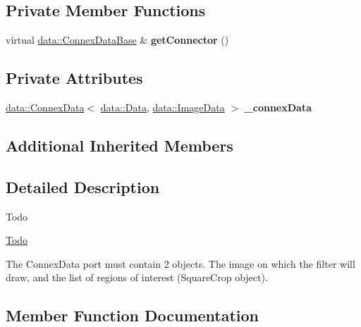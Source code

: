 \subsection*{Private Member Functions}
\begin{DoxyCompactItemize}
\item 
\mbox{\label{classfilter_1_1algos_1_1_overlay_filter_ac8ad6daecef26a002da6dae6ef3f52b2}} 
virtual \hyperlink{classfilter_1_1data_1_1_connex_data_base}{data\+::\+Connex\+Data\+Base} \& {\bfseries get\+Connector} ()
\end{DoxyCompactItemize}
\subsection*{Private Attributes}
\begin{DoxyCompactItemize}
\item 
\mbox{\label{classfilter_1_1algos_1_1_overlay_filter_ae0c4f19d551fb9af6fdb5de88d565017}} 
\hyperlink{classfilter_1_1data_1_1_connex_data}{data\+::\+Connex\+Data}$<$ \hyperlink{classfilter_1_1data_1_1_data}{data\+::\+Data}, \hyperlink{classfilter_1_1data_1_1_image_data}{data\+::\+Image\+Data} $>$ {\bfseries \+\_\+connex\+Data}
\end{DoxyCompactItemize}
\subsection*{Additional Inherited Members}


\subsection{Detailed Description}
\begin{DoxyRefDesc}{Todo}
\item[\hyperlink{todo__todo000011}{Todo}]\end{DoxyRefDesc}
The Connex\+Data port must contain 2 objects. The image on which the filter will draw, and the list of regions of interest (Square\+Crop object). 

\subsection{Member Function Documentation}
\mbox{\label{classfilter_1_1algos_1_1_overlay_filter_ac591ab39d8e08ccfe8f96020e438958d}} 
